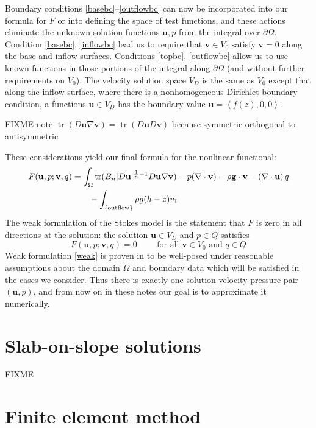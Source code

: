 \documentclass[letterpaper,final,12pt,reqno]{amsart}
\newcommand{\grad}{\nabla}
\newcommand{\trace}{\operatorname{tr}}
\newcommand{\bu}{\mathbf{u}}
\newcommand{\bv}{\mathbf{v}}
\begin{document}
Boundary conditions \eqref{basebc}--\eqref{outflowbc} can now be incorporated into our formula for $F$ or into defining the space of test functions, and these actions eliminate the unknown solution functions $\bu,p$ from the integral over $\partial\Omega$.  Condition \eqref{basebc}, \eqref{inflowbc} lead us to require that $\bv\in V_0$ satisfy $\bv=0$ along the base and inflow surfaces.  Conditions \eqref{topbc}, \eqref{outflowbc} allow us to use known functions in those portions of the integral along $\partial\Omega$ (and without further requirements on $V_0$).  The velocity solution space $V_D$ is the same as $V_0$ except that along the inflow surface, where there is a nonhomogeneous Dirichlet boundary condition, a functions $\bu\in V_D$ has the boundary value $\bu=\left<f(z),0,0\right>$.

FIXME note $\trace(D\bu \grad\bv) = \trace(D\bu D\bv)$ because symmetric orthogonal to antisymmetric

These considerations yield our final formula for the nonlinear functional:
\begin{align}
F(\bu,p;\bv,q) &= \int_\Omega \trace(B_n |D\bu|^{\frac{1}{n} - 1} D\bu \nabla \bv) - p (\nabla \cdot \bv) - \rho \mathbf{g} \cdot \bv - \left(\nabla \cdot \bu\right) q \label{defineF} \\
    &\qquad -\int_{\{\text{outflow}\}} \rho g (h-z) v_1  \notag
\end{align}
The weak formulation of the Stokes model is the statement that $F$ is zero in all directions at the solution: the solution $\bu\in V_D$ and $p\in Q$ satisfies
\begin{equation}
F(\bu,p;\bv,q) = 0 \qquad \text{ for all } \bv\in V_0 \text{ and } q\in Q  \label{weak}
\end{equation}
Weak formulation \eqref{weak} is proven in \cite{JouvetRappaz2011} to be well-posed under reasonable assumptions about the domain $\Omega$ and boundary data which will be satisfied in the cases we consider.  Thus there is exactly one solution velocity-pressure pair $(\bu,p)$, and from now on in these notes our goal is to approximate it numerically.

\section{Slab-on-slope solutions}

FIXME

\section{Finite element method}
\end{document}
